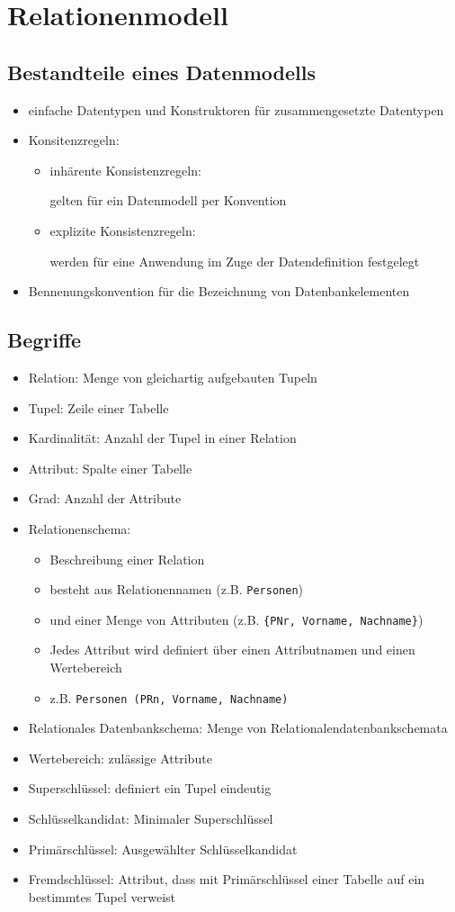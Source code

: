 \section{Relationenmodell}
\subsection{Bestandteile eines Datenmodells}
\begin{itemize}
	\item einfache Datentypen und Konstruktoren für zusammengesetzte Datentypen
	\item Konsitenzregeln:
		\begin{itemize}
			\item inhärente Konsistenzregeln:
					
					gelten für ein Datenmodell per Konvention
			\item explizite Konsistenzregeln:
					
					werden für eine Anwendung im Zuge der Datendefinition festgelegt 
		\end{itemize}
	\item Bennenungskonvention für die Bezeichnung von Datenbankelementen
\end{itemize}

\subsection{Begriffe}
\begin{itemize}
	\item Relation: Menge von gleichartig aufgebauten Tupeln
	\item Tupel: Zeile einer Tabelle
	\item Kardinalität: Anzahl der Tupel in einer Relation
	\item Attribut: Spalte einer Tabelle
	\item Grad: Anzahl der Attribute
	\item Relationenschema: 
			\begin{itemize}
				\item Beschreibung einer Relation
				\item besteht aus Relationennamen (z.B. \verb|Personen|)
				\item und einer Menge von Attributen (z.B. \verb|{PNr, Vorname, Nachname}|)
				\item Jedes Attribut wird definiert über einen Attributnamen und einen Wertebereich
				\item z.B. \verb|Personen (PRn, Vorname, Nachname)| 
			\end{itemize}
	\item Relationales Datenbankschema: Menge von Relationalendatenbankschemata
	\item Wertebereich: zulässige Attribute
	\item Superschlüssel: definiert ein Tupel eindeutig
	\item Schlüsselkandidat: Minimaler Superschlüssel
	\item Primärschlüssel: Ausgewählter Schlüsselkandidat
	\item Fremdschlüssel: Attribut, dass mit Primärschlüssel einer Tabelle auf ein bestimmtes Tupel verweist
\end{itemize}
